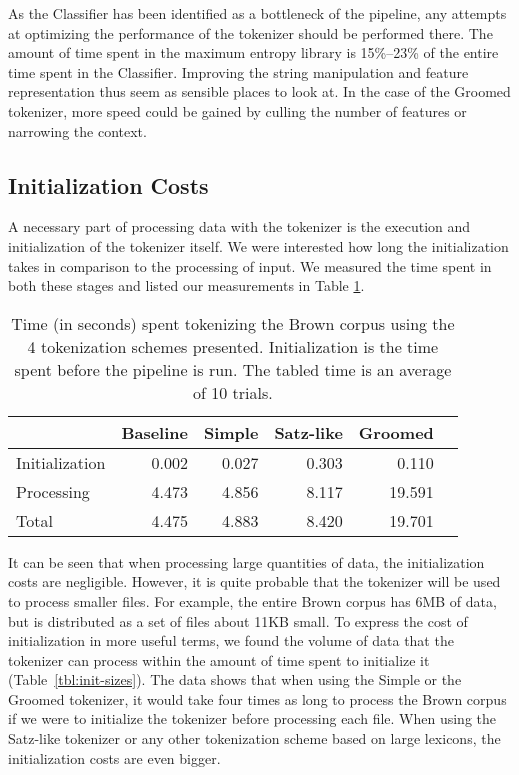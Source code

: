 As the Classifier has been identified as a bottleneck of the pipeline, any
attempts at optimizing the performance of the tokenizer should be performed
there. The amount of time spent in the maximum entropy library is 15\%--23\% of
the entire time spent in the Classifier. Improving the string manipulation and
feature representation thus seem as sensible places to look at. In the case of
the Groomed tokenizer, more speed could be gained by culling the number of
features or narrowing the context.

\subsection{Initialization Costs}
\label{ssec:eval-spd-init}

A necessary part of processing data with the tokenizer is the execution and
initialization of the tokenizer itself. We were interested how long the
initialization takes in comparison to the processing of input. We measured the
time spent in both these stages and listed our measurements in Table
\ref{tbl:timeline}.

\begin{table}
  \begin{center}
    \begin{tabular}{ | l | r | r | r | r | r | }
      \hline
      & Baseline & Simple & Satz-like & Groomed \\ \hline
      Initialization & 0.002 & 0.027 & 0.303 & 0.110 \\ \hline
      Processing & 4.473 & 4.856 & 8.117 & 19.591 \\ \hline
      Total & 4.475 & 4.883 & 8.420 & 19.701 \\
      \hline
    \end{tabular}
  \end{center}
  \caption[Time spent in individual initialization steps]
    {Time (in seconds) spent tokenizing the Brown corpus using the 4
    tokenization schemes presented. Initialization is the time spent before the
    pipeline is run. The tabled time is an average of 10 trials.}
  \label{tbl:timeline}
\end{table}

It can be seen that when processing large quantities of data, the
initialization costs are negligible. However, it is quite probable that the
tokenizer will be used to process smaller files. For example, the entire Brown
corpus has 6MB of data, but is distributed as a set of files about 11KB small.
To express the cost of initialization in more useful terms, we found the volume
of data that the tokenizer can process within the amount of time spent to
initialize it (Table~\ref{tbl:init-sizes}). The data shows that when using the
Simple or the Groomed tokenizer, it would take four times as long to process
the Brown corpus if we were to initialize the tokenizer before processing each
file. When using the Satz-like tokenizer or any other tokenization scheme based
on large lexicons, the initialization costs are even bigger.

